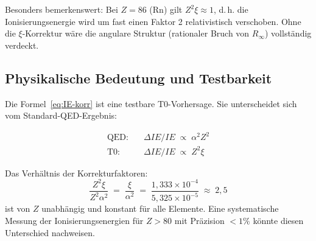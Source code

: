 \begin{table}[htbp]
\centering
\caption{T0-Korrektur der Ionisierungsenergien für $Z > 54$}
\label{tab:schwere-elemente}
\end{table}

Besonders bemerkenswert: Bei $Z = 86$ (Rn) gilt $Z^2\xi \approx 1$, d.\,h.
die Ionisierungsenergie wird um fast einen Faktor 2 relativistisch verschoben.
Ohne die $\xi$-Korrektur wäre die angulare Struktur (rationaler Bruch von
$R_\infty$) vollständig verdeckt.

\subsection{Physikalische Bedeutung und Testbarkeit}
\label{subsec:bedeutung}

Die Formel~\eqref{eq:IE-korr} ist eine testbare T0-Vorhersage.
Sie unterscheidet sich vom Standard-QED-Ergebnis:

\begin{align}
  \text{QED:}\quad &\Delta IE/IE \;\propto\; \alpha^2 Z^2 \\
  \text{T0:}\quad  &\Delta IE/IE \;\propto\; Z^2 \xi
\end{align}

Das Verhältnis der Korrekturfaktoren:
\begin{equation}
  \frac{Z^2 \xi}{Z^2 \alpha^2} \;=\; \frac{\xi}{\alpha^2}
  \;=\; \frac{1{,}333 \times 10^{-4}}{5{,}325 \times 10^{-5}}
  \;\approx\; 2{,}5
\end{equation}
ist von $Z$ unabhängig und konstant für alle Elemente. Eine systematische
Messung der Ionisierungsenergien für $Z > 80$ mit Präzision $<1\%$
könnte diesen Unterschied nachweisen.

